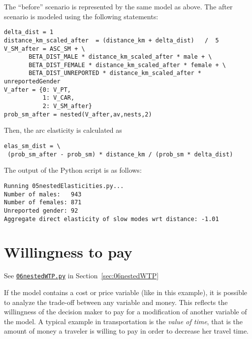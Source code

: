 \documentclass[12pt,a4paper]{article}
\begin{document}
The ``before'' scenario is represented by the same model as above. The
after scenario is modeled using the following statements:
\begin{lstlisting}
delta_dist = 1
distance_km_scaled_after  = (distance_km + delta_dist)   /  5
V_SM_after = ASC_SM + \
       BETA_DIST_MALE * distance_km_scaled_after * male + \
       BETA_DIST_FEMALE * distance_km_scaled_after * female + \
       BETA_DIST_UNREPORTED * distance_km_scaled_after * unreportedGender
V_after = {0: V_PT,
           1: V_CAR,
           2: V_SM_after}
prob_sm_after = nested(V_after,av,nests,2)
\end{lstlisting}
Then, the arc elasticity is calculated as
\begin{lstlisting}
elas_sm_dist = \
 (prob_sm_after - prob_sm) * distance_km / (prob_sm * delta_dist) 
\end{lstlisting}

The output of the Python script is as follows:
\begin{lstlisting}
Running 05nestedElasticities.py...
Number of males:   943
Number of females: 871
Unreported gender: 92
Aggregate direct elasticity of slow modes wrt distance: -1.01
\end{lstlisting}

\section{Willingness to pay}

\begin{flushright}
See \href{http://biogeme.epfl.ch/examples/indicators/python/06nestedWTP.py}{\lstinline$06nestedWTP.py$} in Section~\ref{sec:06nestedWTP}
\end{flushright}


If the model contains a cost or price variable (like in this example),
it is possible to analyze the trade-off between any variable and money. 
This reflects the willingness of the decision maker to pay for a modification of another variable of the model.
A typical example in transportation is the \emph{value of time}, that
is the amount of money a traveler is willing to pay in order to
decrease her travel time.
\end{document}
